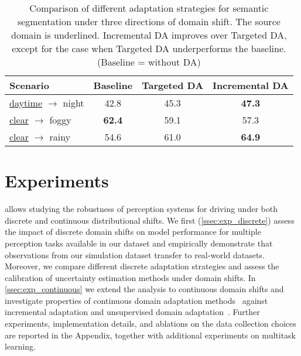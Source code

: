 \begin{table}[t]
\centering
\footnotesize
\setlength{\tabcolsep}{6pt}

\begin{tabular}{lccc}
\toprule
\textbf{Scenario}             & \multicolumn{1}{c}{{Baseline}} & {Targeted DA} & \multicolumn{1}{c}{{Incremental DA}} \\ \midrule
\underline{daytime} $\rightarrow$ night & 42.8                           & 45.3                                  & \textbf{47.3}                        \\
\underline{clear} $\rightarrow$ foggy   & \textbf{62.4}                  & 59.1                                  & 57.3                                 \\
\underline{clear} $\rightarrow$ rainy            & 54.6                           & 61.0                                  & \textbf{64.9}                        \\
\bottomrule
\end{tabular}\caption{Comparison of different adaptation strategies for semantic segmentation under three directions of domain shift. The source domain is underlined. Incremental DA improves over Targeted DA, except for the case when Targeted DA underperforms the baseline. (Baseline = without DA)} \label{tab:incremental_vs_targeted}
\vspace{-1em}
\end{table}

\section{Experiments}
\thedataset allows studying the robustness of perception systems for driving under both discrete and continuous distributional shifts.
We first (\autoref{ssec:exp_discrete}) assess the impact of discrete domain shifts on model performance for multiple perception tasks available in our dataset and empirically demonstrate that observations from our simulation dataset transfer to real-world datasets. Moreover, we compare different discrete adaptation strategies and assess the calibration of uncertainty estimation methods under domain shifts. 
In \autoref{ssec:exp_continuous} we extend the analysis to continuous domain shifts and investigate properties of continuous domain adaptation methods~\cite{wang2020tent} against incremental adaptation and unsupervised domain adaptation~\cite{vu2019advent}.
Further experiments, implementation details, and ablations on the data collection choices are reported in the Appendix,
together with additional experiments on multitask learning.


